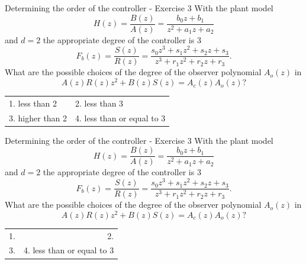 \documentclass[presentation,aspectratio=169]{beamer}
\begin{document}
\begin{frame}[label={sec:org876a703}]{Determining the order of the controller - Exercise 3}
With the plant model \[H(z) = \frac{B(z)}{A(z)} = \frac{b_0z + b_1}{z^2 + a_1z + a_2}\] and \(d=2\)    the appropriate degree of the controller is 3 
\[F_b(z) = \frac{S(z)}{R(z)} = \frac{s_0z^3 + s_1z^2 + s_2z + s_3}{z^3 + r_1 z^2 + r_2z + r_3}.\]
What are the possible choices of the degree of the observer polynomial \(A_o(z)\) in
\[ A(z)R(z)z^2 + B(z)S(z) = A_c(z)A_o(z)?\]
\begin{center}
\begin{tabular}{ll}
1. less than 2 & 2. less than 3\\
3. higher than 2 & 4. less than or equal to 3\\
\end{tabular}
\end{center}
\end{frame}

\begin{frame}[label={sec:org7f86042}]{Determining the order of the controller - Exercise 3}
With the plant model \[H(z) = \frac{B(z)}{A(z)} = \frac{b_0z + b_1}{z^2 + a_1z + a_2}\] and \(d=2\)    the appropriate degree of the controller is 3
\[F_b(z) = \frac{S(z)}{R(z)} = \frac{s_0z^3 + s_1z^2 + s_2z + s_3}{z^3 + r_1 z^2 + r_2z + r_3}.\]
What are the possible choices of the degree of the observer polynomial \(A_o(z)\) in
\[ A(z)R(z)z^2 + B(z)S(z) = A_c(z)A_o(z)?\]
\begin{center}
\begin{tabular}{rr}
1. & 2.\\
3. & 4. less than or equal to 3\\
\end{tabular}
\end{center}
\end{frame}
\end{document}
